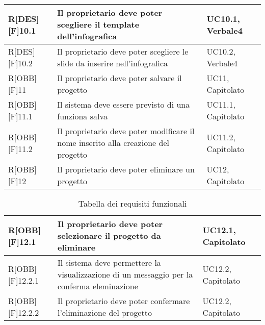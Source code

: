 \begin{table}[h]
\begin{tabular}{|p{}|p{}|p{}|}
R[DES][F]10.1 & Il proprietario deve poter scegliere il \gls{template} dell'\gls{infografica} & UC10.1, Verbale4 \\ \midrule
R[DES][F]10.2 & Il proprietario deve poter scegliere le \gls{slide} da inserire nell'\gls{infografica} & UC10.2, Verbale4 \\ \midrule
R[OBB][F]11 & Il proprietario deve poter salvare il progetto & UC11, Capitolato  \\ \midrule
R[OBB][F]11.1 & Il sistema deve essere previsto di una funziona salva & UC11.1, Capitolato \\ \midrule
R[OBB][F]11.2 & Il proprietario deve poter modificare il nome inserito alla creazione del progetto & UC11.2, Capitolato \\ \midrule
R[OBB][F]12 & Il proprietario deve poter eliminare un progetto & UC12, Capitolato \\ \midrule

		\end{tabular}
	\end{table}
	\newpage
	
	\begin{table}[h]
		\begin{tabular}{|p{}|p{}|p{}|}
			\midrule
			
R[OBB][F]12.1 & Il proprietario deve poter selezionare il progetto da eliminare & UC12.1, Capitolato \\ \midrule
R[OBB][F]12.2.1 & Il sistema deve permettere la visualizzazione di un messaggio per la conferma eleminazione & UC12.2, Capitolato \\ \midrule
R[OBB][F]12.2.2 & Il proprietario deve poter confermare l'eliminazione del progetto  & UC12.2, Capitolato \\ \midrule

		\end{tabular}
		\caption{Tabella dei requisiti funzionali}
	\end{table}
	\newpage

